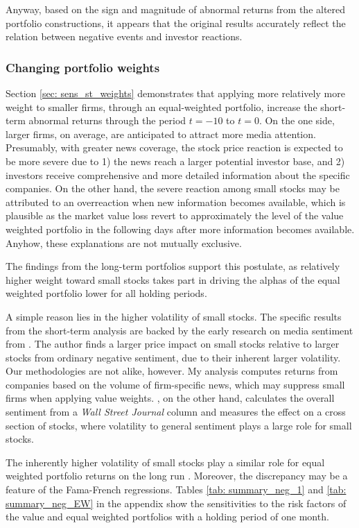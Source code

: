 Anyway, based on the sign and magnitude of abnormal returns from the altered portfolio constructions, it appears that the original results accurately reflect the relation between negative events and investor reactions.  

\subsubsection{Changing portfolio weights}

Section \ref{sec: sens_st_weights} demonstrates that applying more relatively more weight to smaller firms, through an equal-weighted portfolio, increase the short-term abnormal returns through the period $t = -10$ to $t = 0$. On the one side, larger firms, on average, are anticipated to attract more media attention. Presumably, with greater news coverage, the stock price reaction is expected to be more severe due to 1) the news reach a larger potential investor base, and 2) investors receive comprehensive and more detailed information about the specific companies. On the other hand, the severe reaction among small stocks may be attributed to an overreaction when new information becomes available, which is plausible as the market value loss revert to approximately the level of the value weighted portfolio in the following days after more information becomes available. Anyhow, these explanations are not mutually exclusive. 

The findings from the long-term portfolios support this postulate, as relatively higher weight toward small stocks takes part in driving the alphas of the equal weighted portfolio lower for all holding periods.

A simple reason lies in the higher volatility of small stocks. The specific results from the short-term analysis are backed by the early research on media sentiment from \cite{tetlock_sentiment}. The author finds a larger price impact on small stocks relative to larger stocks from ordinary negative sentiment, due to their inherent larger volatility. Our methodologies are not alike, however. My analysis computes returns from companies based on the volume of firm-specific news, which may suppress small firms when applying value weights.  \citeauthor{tetlock_sentiment}, on the other hand, calculates the overall sentiment from a \textit{Wall Street Journal} column and measures the effect on a cross section of stocks, where volatility to general sentiment plays a large role for small stocks. 

The inherently higher volatility of small stocks play a similar role for equal weighted portfolio returns on the long run \citep{Fama_french_3fac}. 
Moreover, the discrepancy may be a feature of the Fama-French regressions. Tables \ref{tab: summary_neg_1} and \ref{tab: summary_neg_EW} in the appendix show the sensitivities to the risk factors of the value and equal weighted portfolios with a holding period of one month.  

